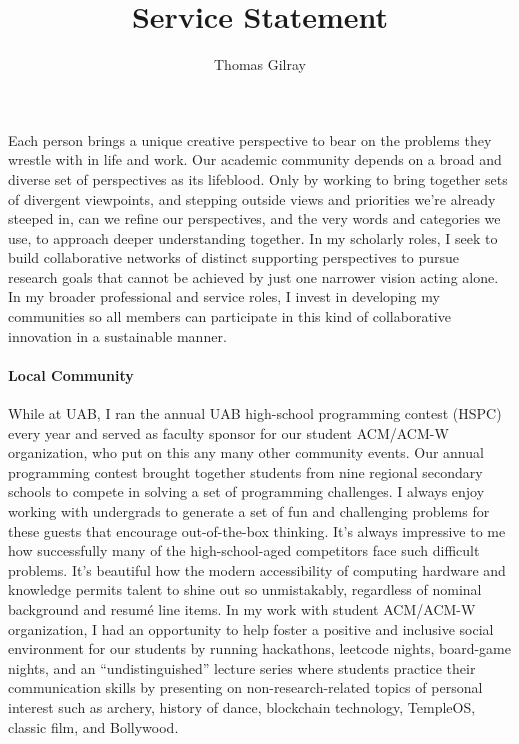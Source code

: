 \documentclass[12pt]{article}
\begin{document}
\title{Service Statement\vspace{-0.25cm}}
\author{Thomas Gilray}
\date{}
\maketitle
\vspace{-1.45cm}


Each person brings a unique creative perspective to bear on the problems they wrestle with in life and work. Our academic community depends on a broad and diverse set of perspectives as its lifeblood.
Only by working to bring together sets of divergent viewpoints, and stepping outside views and priorities we're already steeped in, can we refine our perspectives, and the very words and categories we use, to approach deeper understanding together.
In my scholarly roles, I seek to build collaborative networks of distinct supporting perspectives to pursue research goals that cannot be achieved by just one narrower vision acting alone. In my broader professional and service roles, I invest in developing my communities so all members can participate in this kind of collaborative innovation in a sustainable manner.  

\paragraph*{Local Community}
While at UAB, I ran the annual UAB high-school programming contest (HSPC) every year and served as faculty sponsor for our student ACM/ACM-W organization, who put on this any many other community events.
Our annual programming contest brought together students from nine regional secondary schools to compete in solving a set of programming challenges. I always enjoy working with undergrads to generate a set of fun and challenging problems for these guests that encourage out-of-the-box thinking. It's always impressive to me how successfully many of the high-school-aged competitors face such difficult problems. It's beautiful how the modern accessibility of computing hardware and knowledge permits talent to shine out so unmistakably, regardless of nominal background and resum\'e line items. In my work with student ACM/ACM-W organization, I had an opportunity to help foster a positive and inclusive social environment for our students by running hackathons, leetcode nights, board-game nights, and an ``undistinguished'' lecture series where students practice their communication skills by presenting on non-research-related topics of personal interest such as archery, history of dance, blockchain technology, TempleOS, classic film, and Bollywood.
\end{document}
